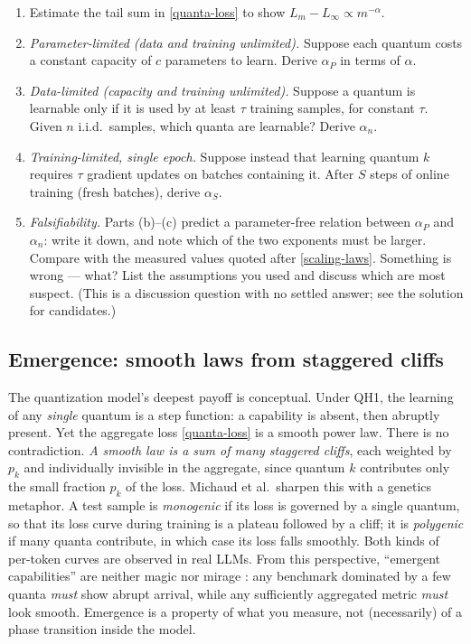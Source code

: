 \documentclass[11pt]{article}
\begin{document}
\begin{exercise}
\label{ex:quanta}
\important
\begin{enumerate}
    \item Estimate the tail sum in \eqref{quanta-loss} to show $L_m - L_\infty \propto m^{-\alpha}$.
    \item \emph{Parameter-limited (data and training unlimited).} Suppose each quantum costs a constant capacity of $c$ parameters to learn. Derive $\alpha_P$ in terms of $\alpha$.
    \item\label{ex:quanta-data} \emph{Data-limited (capacity and training unlimited).} Suppose a quantum is learnable only if it is used by at least $\tau$ training samples, for constant $\tau$. Given $n$ i.i.d.\ samples, which quanta are learnable? Derive $\alpha_n$.
    \item\label{ex:quanta-training} \emph{Training-limited, single epoch.} Suppose instead that learning quantum $k$ requires $\tau$ gradient updates on batches containing it. After $S$ steps of online training (fresh batches), derive $\alpha_S$.
    \item\label{ex:quanta-falsify} \emph{Falsifiability.} Parts (b)--(c) predict a parameter-free relation between $\alpha_P$ and $\alpha_n$: write it down, and note which of the two exponents must be larger. Compare with the measured values quoted after \eqref{scaling-laws}. Something is wrong --- what? List the assumptions you used and discuss which are most suspect. (This is a discussion question with no settled answer; see the solution for candidates.)
\end{enumerate}
\end{exercise}


\subsection{Emergence: smooth laws from staggered cliffs}
\label{sec:emergence}

The quantization model's deepest payoff is conceptual. Under QH1, the learning of any \emph{single} quantum is a step function: a capability is absent, then abruptly present. Yet the aggregate loss \eqref{quanta-loss} is a smooth power law. There is no contradiction. \emph{A smooth law is a sum of many staggered cliffs}, each weighted by $p_k$ and individually invisible in the aggregate, since quantum $k$ contributes only the small fraction $p_k$ of the loss. Michaud et al.\ sharpen this with a genetics metaphor. A test sample is \emph{monogenic} if its loss is governed by a single quantum, so that its loss curve during training is a plateau followed by a cliff; it is \emph{polygenic} if many quanta contribute, in which case its loss falls smoothly. Both kinds of per-token curves are observed in real LLMs. From this perspective, ``emergent capabilities'' \cite{wei2022emergent} are neither magic nor mirage \cite{schaeffer2023emergent}: any benchmark dominated by a few quanta \emph{must} show abrupt arrival, while any sufficiently aggregated metric \emph{must} look smooth. Emergence is a property of what you measure, not (necessarily) of a phase transition inside the model.
\end{document}
